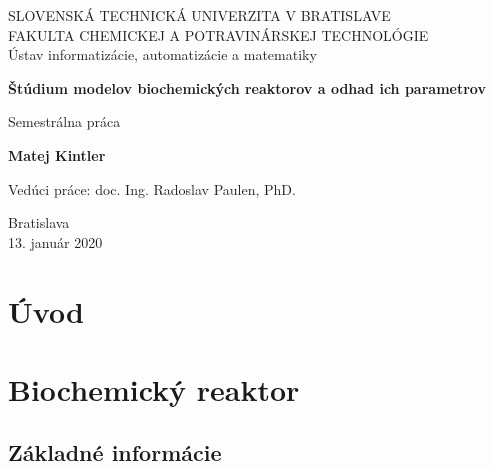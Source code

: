 \documentclass[fleqn]{article}
\begin{document}
	
\begin{titlepage}
	\begin{center}
		\vspace*{1cm}
		\LARGE
		SLOVENSKÁ TECHNICKÁ UNIVERZITA V BRATISLAVE \\
		\Large
		FAKULTA CHEMICKEJ A POTRAVINÁRSKEJ TECHNOLÓGIE \\
		\vspace*{.5cm}
		\large
		Ústav informatizácie, automatizácie a matematiky \\
		\vspace*{5cm}
		
		\Huge
		\textbf{Štúdium modelov biochemických reaktorov a odhad ich parametrov}
		
		\vspace{0.5cm}
		\LARGE
		Semestrálna práca
		
		\vspace{1.5cm}
		
		\textbf{Matej Kintler}
		
		\vfill
		\begin{flushleft}
			\large
			Vedúci práce: doc. Ing. Radoslav Paulen, PhD.
		\end{flushleft}
	
		\vspace{1.5cm}
	
		\Large
		Bratislava\\
		13. január 2020
		
	\end{center}
\end{titlepage}

\newpage

\tableofcontents
\pagestyle{empty}

\newpage
\pagestyle{plain}

\section{Úvod}


\section{Biochemický reaktor}
\subsection{Základné informácie}

\end{document}
